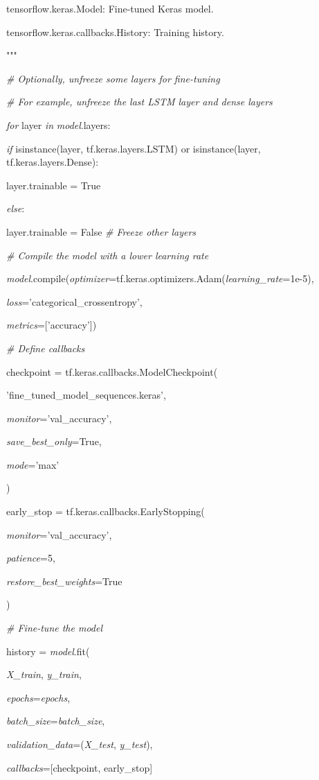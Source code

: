 \documentclass[
]{article}
\begin{document}
tensorflow.keras.Model: Fine-tuned Keras model.

tensorflow.keras.callbacks.History: Training history.

"""

\emph{\# Optionally, unfreeze some layers for fine-tuning}

\emph{\# For example, unfreeze the last LSTM layer and dense layers}

\emph{for} layer \emph{in} \emph{model}.layers:

\emph{if} isinstance(layer, tf.keras.layers.LSTM) or isinstance(layer, tf.keras.layers.Dense):

layer.trainable = True

\emph{else}:

layer.trainable = False \emph{\# Freeze other layers}

\emph{\# Compile the model with a lower learning rate}

\emph{model}.compile(\emph{optimizer}=tf.keras.optimizers.Adam(\emph{learning\_rate}=1e-5),

\emph{loss}='categorical\_crossentropy',

\emph{metrics}={[}'accuracy'{]})

\emph{\# Define callbacks}

checkpoint = tf.keras.callbacks.ModelCheckpoint(

'fine\_tuned\_model\_sequences.keras',

\emph{monitor}='val\_accuracy',

\emph{save\_best\_only}=True,

\emph{mode}='max'

)

early\_stop = tf.keras.callbacks.EarlyStopping(

\emph{monitor}='val\_accuracy',

\emph{patience}=5,

\emph{restore\_best\_weights}=True

)

\emph{\# Fine-tune the model}

history = \emph{model}.fit(

\emph{X\_train}, \emph{y\_train},

\emph{epochs}=\emph{epochs},

\emph{batch\_size}=\emph{batch\_size},

\emph{validation\_data}=(\emph{X\_test}, \emph{y\_test}),

\emph{callbacks}={[}checkpoint, early\_stop{]}
\end{document}
